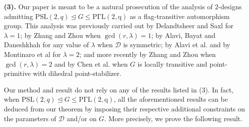 \documentclass[a4paper,twopage,reqno,12pt]{amsart}
\theoremstyle{definition}
\numberwithin{equation}{section}
\newcommand{\PSL}{\mathrm{PSL}}
\newcommand{\PGaL}{\mathrm{P\Gamma L}}
\renewcommand{\leq}{\leqslant}
\begin{document}
\noindent \textbf{(3).} Our paper is meant to be a natural prosecution of the analysis of
$2$-designs admitting $\PSL(2,q)\trianglelefteq G\leq \mathrm{\PGaL(2,q)}$ as a flag-transitive automorphism group. This analysis was previously carried out by Delandtsheer \cite{De} and Saxl \cite{Saxl} for $\lambda =1$;
by Zhang and Zhou \cite{ZZ} when $\gcd(r,\lambda)=1$;
by Alavi, Bayat and Daneshkhah \cite{AlaviSymPSL2} for any value of $\lambda $ when $\mathcal{D}$ is symmetric; 
by Alavi et al. \cite{ABDT} and by Montinaro et al \cite{MZZZ} for $\lambda =2$;
and more recently by Zhang and Zhou \cite{ZZ2} when $\gcd(r,\lambda)=2$ and
by Chen et al. \cite{CWX} when $G$ is locally transitive and point-primitive with dihedral point-stabilizer.

\smallskip
Our method and result do not rely on any of the results listed in (3). 
In fact, when $\PSL(2,q)\trianglelefteq G\leq \mathrm{\PGaL(2,q)}$, 
all the aforementioned results can be deduced from our theorem by imposing their respective additional constraints on the parameters of $\mathcal{D}$ and/or on $G$. More precisely, we prove the following result.
\end{document}
